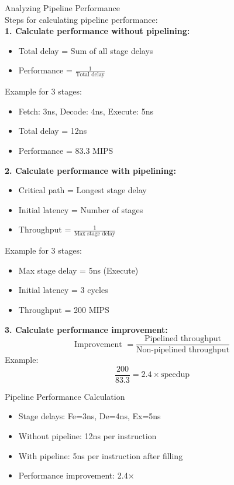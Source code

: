 \begin{KR}{Analyzing Pipeline Performance}\\
Steps for calculating pipeline performance:
\vspace{2mm}\\
\textbf{1. Calculate performance without pipelining:}
\begin{itemize}
  \item Total delay = Sum of all stage delays
  \item Performance = $\frac{1}{\text{Total delay}}$
\end{itemize}
Example for 3 stages:
    \begin{itemize}
      \item Fetch: 3ns, Decode: 4ns, Execute: 5ns
      \item Total delay = 12ns
      \item Performance = 83.3 MIPS
    \end{itemize}
\vspace{2mm}
\textbf{2. Calculate performance with pipelining:}
\begin{itemize}
  \item Critical path = Longest stage delay
  \item Initial latency = Number of stages
  \item Throughput = $\frac{1}{\text{Max stage delay}}$
\end{itemize}
Example for 3 stages:
    \begin{itemize}
      \item Max stage delay = 5ns (Execute)
      \item Initial latency = 3 cycles
      \item Throughput = 200 MIPS
    \end{itemize}
\vspace{2mm}
\textbf{3. Calculate performance improvement:}
$$\text{Improvement }=\frac{\text{Pipelined throughput}}{\text{Non-pipelined throughput}}$$
Example: $$\frac{200}{83.3} = 2.4\times \text{speedup}$$ 
\end{KR}

\begin{example2}{Pipeline Performance Calculation}
\begin{itemize}
  \item Stage delays: Fe=3ns, De=4ns, Ex=5ns
  \item Without pipeline: 12ns per instruction
  \item With pipeline: 5ns per instruction after filling
  \item Performance improvement: 2.4×
\end{itemize}
\end{example2}



